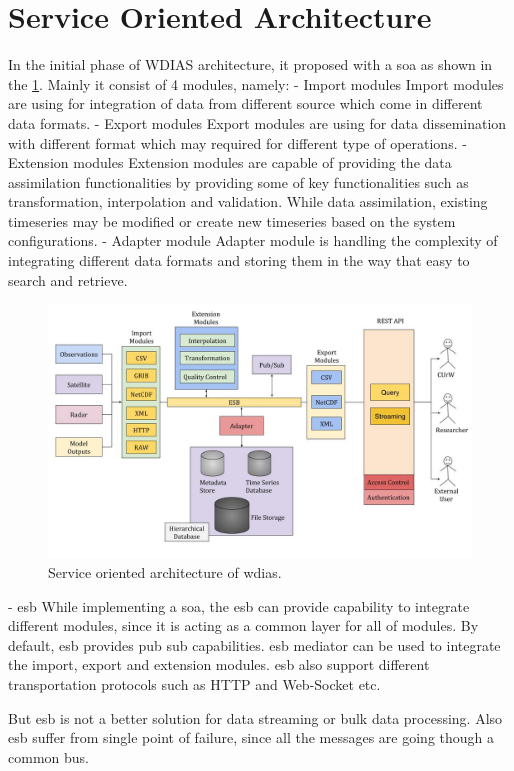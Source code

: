 \section{Service Oriented Architecture}

In the initial phase of WDIAS architecture, it proposed with a \acrfull{soa} as shown in the \ref{fi:proposed_soa}. Mainly it consist of 4 modules, namely:
- Import modules
Import modules are using for integration of data from different source which come in different data formats.
- Export modules
Export modules are using for data dissemination with different format which may required for different type of operations.
- Extension modules
Extension modules are capable of providing the data assimilation functionalities by providing some of key functionalities such as transformation, interpolation and validation. While data assimilation, existing timeseries may be modified or create new timeseries based on the system configurations.
- Adapter module
Adapter module is handling the complexity of integrating different data formats and storing them in the way that easy to search and retrieve.

\begin{figure}[htp]
    \centering
    \includegraphics[width=1\textwidth]{soa/soa_v1.jpg}
    \caption{Service oriented architecture of \acrshort{wdias}.}
    \label{fi:proposed_soa}
\end{figure}

- \acrfull{esb}
While implementing a \acrfull{soa}, the \acrfull{esb} can provide capability to integrate different modules, since it is acting as a common layer for all of modules.
By default, \acrshort{esb} provides pub sub capabilities.
\acrshort{esb} mediator can be used to integrate the import, export and extension modules. \acrshort{esb} also support different transportation protocols such as HTTP and Web-Socket etc.

But \acrshort{esb} is not a better solution for data streaming or bulk data processing. Also \acrshort{esb} suffer from single point of failure, since all the messages are going though a common bus.